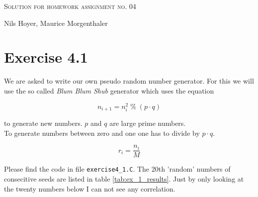 \documentclass[10pt]{article}
\newenvironment{myfont}{\fontfamily{put}\selectfont}{\par}
\begin{document}
\begin{myfont}

\begin{center}
  \begin{Large}
    \textsc{Solution for homework assignment no. 04} \\
  \end{Large}
	\vspace*{0.4cm}
    Nils Hoyer, Maurice Morgenthaler
  \vspace*{1cm}
\end{center}

\section*{Exercise 4.1}

We are asked to write our own pseudo random number generator.
For this we will use the so called \textit{Blum Blum Shub} generator which uses the equation

\begin{equation}
n_{i+1} = n_{i}^{2} \;\%\; (p \cdot q)
\end{equation}

\noindent to generate new numbers.
$p$ and $q$ are large prime numbers. \\
To generate numbers between zero and one one has to divide by $p \cdot q$.

\begin{equation}
r_{i} = \frac{n_{i}}{M}
\end{equation}

\noindent Please find the code in file \texttt{exercise4\_1.C}.
The 20th 'random' numbers of consecitive seeds are listed in table \ref{tab:ex_1_results}.
Just by only looking at the twenty numbers below I can not see any correlation.


\end{myfont}
\end{document}
